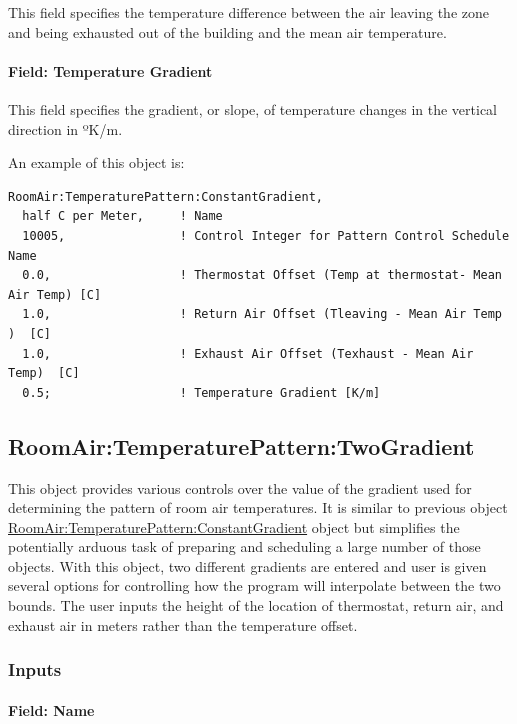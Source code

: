 This field specifies the temperature difference between the air leaving the zone and being exhausted out of the building and the mean air temperature.

\paragraph{Field: Temperature Gradient}\label{field-temperature-gradient}

This field specifies the gradient, or slope, of temperature changes in the vertical direction in ºK/m.

An example of this object is:

\begin{lstlisting}
RoomAir:TemperaturePattern:ConstantGradient,
  half C per Meter,     ! Name
  10005,                ! Control Integer for Pattern Control Schedule Name
  0.0,                  ! Thermostat Offset (Temp at thermostat- Mean Air Temp) [C]
  1.0,                  ! Return Air Offset (Tleaving - Mean Air Temp )  [C]
  1.0,                  ! Exhaust Air Offset (Texhaust - Mean Air Temp)  [C]
  0.5;                  ! Temperature Gradient [K/m]
\end{lstlisting}

\subsection{RoomAir:TemperaturePattern:TwoGradient}\label{roomairtemperaturepatterntwogradient}

This object provides various controls over the value of the gradient used for determining the pattern of room air temperatures. It is similar to previous object \hyperref[roomairtemperaturepatternconstantgradient]{RoomAir:TemperaturePattern:ConstantGradient} object but simplifies the potentially arduous task of preparing and scheduling a large number of those objects. With this object, two different gradients are entered and user is given several options for controlling how the program will interpolate between the two bounds. The user inputs the height of the location of thermostat, return air, and exhaust air in meters rather than the temperature offset.

\subsubsection{Inputs}\label{inputs-3-031}

\paragraph{Field: Name}\label{field-name-3-027}

